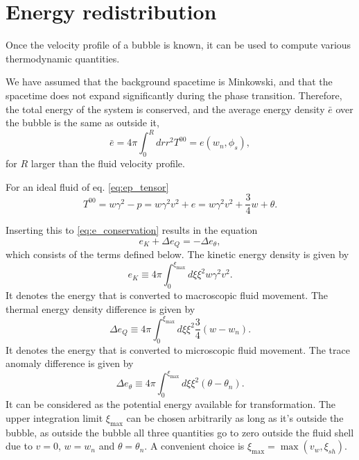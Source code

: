 \section{Energy redistribution}
\label{energy_redistribution}
Once the velocity profile of a bubble is known, it can be used to compute various thermodynamic quantities.

We have assumed that the background spacetime is Minkowski, and that the spacetime does not expand significantly during the phase transition.
Therefore, the total energy of the system is conserved, and the average energy density $\bar{e}$ over the bubble is the same as outside it,
\begin{equation}
\bar{e} = 4 \pi \int_0^R dr r^2 T^{00} = e(w_n, \phi_s),
\label{eq:e_conservation}
\end{equation}
for $R$ larger than the fluid velocity profile.

For an ideal fluid of eq. \eqref{eq:ep_tensor}
\begin{equation}
T^{00} = w\gamma^2 - p = w\gamma^2 v^2 + e = w\gamma^2 v^2 + \frac{3}{4}w + \theta.
\end{equation}

Inserting this to \eqref{eq:e_conservation} results in the equation
\begin{equation}
e_K + \Delta e_Q = - \Delta e_\theta,
\end{equation}
which consists of the terms defined below.
The kinetic energy density is given by
\begin{equation}
e_K \equiv 4 \pi \int_0^{\xi_\text{max}} d\xi \xi^2 w \gamma^2 v^2.
\end{equation}
It denotes the energy that is converted to macroscopic fluid movement.
The thermal energy density difference is given by
\begin{equation}
\Delta e_Q \equiv 4 \pi \int_0^{\xi_\text{max}} d\xi \xi^2 \frac{3}{4} (w - w_n).
\end{equation}
It denotes the energy that is converted to microscopic fluid movement.
The trace anomaly difference is given by
\begin{equation}
\Delta e_\theta \equiv 4 \pi \int_0^{\xi_\text{max}} d\xi \xi^2 (\theta - \theta_n).
\end{equation}
It can be considered as the potential energy available for transformation.
The upper integration limit $\xi_\text{max}$ can be chosen arbitrarily as long as it's outside the bubble, as outside the bubble all three quantities go to zero outside the fluid shell due to $v=0$, $w=w_n$ and $\theta = \theta_n$.
A convenient choice is $\xi_\text{max} = \max (v_w, \xi_{sh})$.

